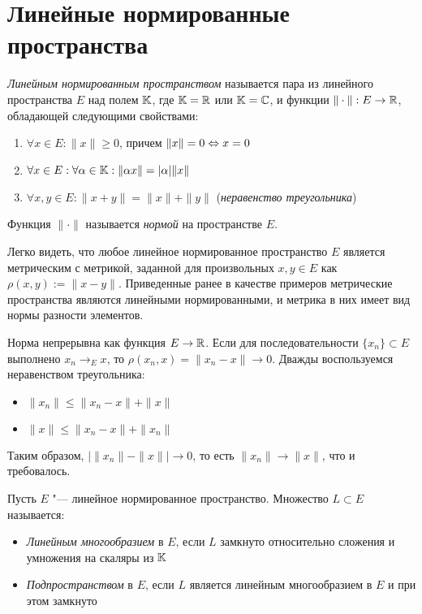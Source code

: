 \section{Линейные нормированные пространства}

\begin{definition}
	\textit{Линейным нормированным пространством} называется пара из линейного пространства $E$ над полем $\mathbb{K}$, где $\mathbb{K} = \mathbb{R}$ или $\mathbb{K} = \mathbb{C}$, и функции $\|\cdot\| : E \to \mathbb{R}$, обладающей следующими свойствами:
	\begin{enumerate}
		\item $\forall x \in E: \|x\| \ge 0$, причем $\|x\| = 0 \Leftrightarrow x = 0$
		\item $\forall x \in E: \forall \alpha \in \mathbb{K}: \|\alpha x\| = |\alpha|\|x\|$
		\item $\forall x, y \in E: \|x + y\| = \|x\| + \|y\|$ (\textit{неравенство треугольника})
	\end{enumerate}

	Функция $\|\cdot\|$ называется \textit{нормой} на пространстве $E$.
\end{definition}

\begin{example}
    Легко видеть, что любое линейное нормированное пространство $E$ является метрическим с метрикой, заданной для произвольных $x, y \in E$ как $\rho(x, y) := \|x - y\|$. Приведенные ранее в качестве примеров метрические пространства являются линейными нормированными, и метрика в них имеет вид нормы разности элементов.
\end{example}

\begin{note}
	Норма непрерывна как функция $E \to \mathbb{R}$. Если для последовательности $\{x_n\} \subset E$ выполнено $x_n \to_E x$, то $\rho(x_n, x) = \|x_n - x\| \to 0$. Дважды воспользуемся неравенством треугольника:
	\begin{itemize}
		\item $\|x_n\| \le \|x_n - x\| + \|x\|$
		\item $\|x\| \le \|x_n - x\| + \|x_n\|$
	\end{itemize}

	Таким образом, $\big|\|x_n\| - \|x\|\big| \to 0$, то есть $\|x_n\| \to \|x\|$, что и требовалось.
\end{note}

\begin{definition}
	Пусть $E$ "--- линейное нормированное пространство. Множество $L \subset E$ называется:
	\begin{itemize}
		\item \textit{Линейным многообразием} в $E$, если $L$ замкнуто относительно сложения и умножения на скаляры из $\mathbb{K}$
  		\item \textit{Подпространством} в $E$, если $L$ является линейным многообразием в $E$ и при этом замкнуто 
	\end{itemize}
\end{definition}

